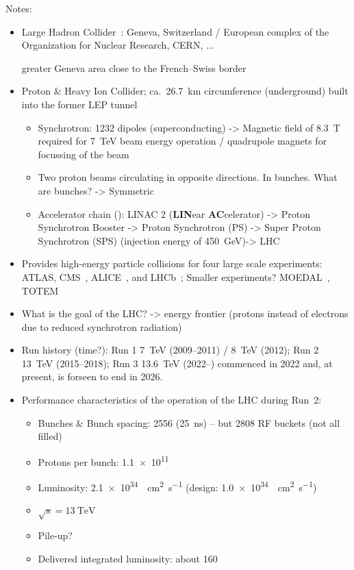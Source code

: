 Notes:
\begin{itemize}

\item Large Hadron Collider~\cite{Evans:2008zzb}: Geneva, Switzerland / European
  complex of the Organization for Nuclear Research, CERN, ...

  greater Geneva area close to the French--Swiss border

\item Proton \& Heavy Ion Collider; ca.\ \SI{26.7}{\kilo\metre} circumference
  (underground) built into the former LEP tunnel
  \begin{itemize}

  \item Synchrotron: 1232 dipoles (superconducting) -> Magnetic field of
    \SI{8.3}{\tesla} required for \SI{7}{\TeV} beam energy operation /
    quadrupole magnets for focussing of the beam

  \item Two proton beams circulating in opposite directions. In bunches. What
    are bunches? -> Symmetric

  \item Accelerator chain (\pp): LINAC 2 (\textbf{LIN}ear \textbf{AC}celerator)
    -> Proton Synchrotron Booster -> Proton Synchrotron (PS) -> Super Proton
    Synchrotron (SPS) (injection energy of \SI{450}{\GeV})-> LHC
  \end{itemize}

\item Provides high-energy particle collisions for four large scale experiments:
  ATLAS, CMS~\cite{CMS-CMS-00-001}, ALICE~\cite{ALICE:2008ngc}, and
  LHCb~\cite{LHCb:2008vvz}; Smaller experiments?  MOEDAL~\cite{MoEDAL:2009jwa},
  TOTEM~\cite{TOTEM:2008lue}

\item What is the goal of the LHC? -> energy frontier (protons instead of
  electrons due to reduced synchrotron radiation)

\item Run history (time?): Run 1 \SI{7}{\TeV} (2009--2011) / \SI{8}{\TeV}
  (2012); Run 2 \SI{13}{\TeV} (2015--2018); Run 3 \SI{13.6}{\TeV} (2022--)
  commenced in 2022 and, at present, is forseen to end in 2026.

\item Performance characteristics of the \pp operation of the LHC during Run~2:

  \begin{itemize}
  \item Bunches \& Bunch spacing: 2556 (\SI{25}{\nano\second}) -- but 2808 RF
    buckets (not all filled)
  \item Protons per bunch: \num{1.1e11}
  \item Luminosity: \SI{2.1e34}{\per\centi\metre\squared\per\second} (design:
    \SI{1.0e34}{\per\centi\metre\squared\per\second})
  \item $\sqrt{s} = \SI{13}{\TeV}$
  \item Pile-up?
  \item Delivered integrated luminosity: about \SI{160}{\ifb}
    \end{itemize}


\end{itemize}
